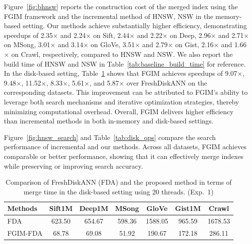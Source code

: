 \documentclass[acmsmall]{acmart}
\theoremstyle{remark}
\theoremstyle{definition}
\begin{document}
Figure~\ref{fig:bhnsw} reports the construction cost of the merged index using the FGIM framework and the incremental method of HNSW, NSW in the memory-based setting. Our methods achieve substantially higher efficiency, demonstrating speedups of 2.35$\times$ and 2.24$\times$ on Sift, 2.44$\times$ and 2.22$\times$ on Deep, 2.96$\times$ and 2.71$\times$ on MSong, 3.01$\times$ and 3.14$\times$ on GloVe, 3.51$\times$ and 2.79$\times$ on Gist, 2.16$\times$ and 1.66$\times$ on Crawl, respectively, compared to HNSW and NSW. We also report the build time of HNSW and NSW in Table~\ref{tab:baseline_build_time} for reference. In the disk-based setting, Table~\ref{tab:disk_merge_time} shows that FGIM achieves speedups of 9.07$\times$, 9.48$\times$, 11.52$\times$, 8.33$\times$, 5.61$\times$, and 5.87$\times$ over FreshDiskANN on the corresponding datasets.
This improvement can be attributed to FGIM's ability to leverage both search mechanisms and iterative optimization strategies, thereby minimizing computational overhead. Overall, FGIM delivers higher efficiency than incremental methods in both in-memory and disk-based settings.

Figure~\ref{fig:hnsw_search} and Table~\ref{tab:disk_qps} compare the search performance of incremental and our methods. Across all datasets, FGIM achieves comparable or better performance, showing that it can effectively merge indexes while preserving or improving search accuracy.


\begin{table}[t]
	\small
	\centering
	\vspace{-1ex}
	\caption{Comparison of FreshDiskANN (FDA) and the proposed method in terms of merge time in the disk-based setting using 20 threads. (Exp.~1)}
	\vspace{-2ex}
	\begin{tabular}{lcccccc}
		\toprule
		\textbf{Methods} & Sift1M & Deep1M & MSong & GloVe & Gist1M & Crawl \\
		\midrule
		FDA & 623.50 & 654.67 & 598.36 & 1588.05 & 965.59 & 1678.53 \\
		FGIM-FDA & 68.78 & 69.08 & 51.92 & 190.67 & 172.18 & 286.11 \\
		\bottomrule
	\end{tabular}
	\vspace{-1ex}
	\label{tab:disk_merge_time}
\end{table}
\end{document}
